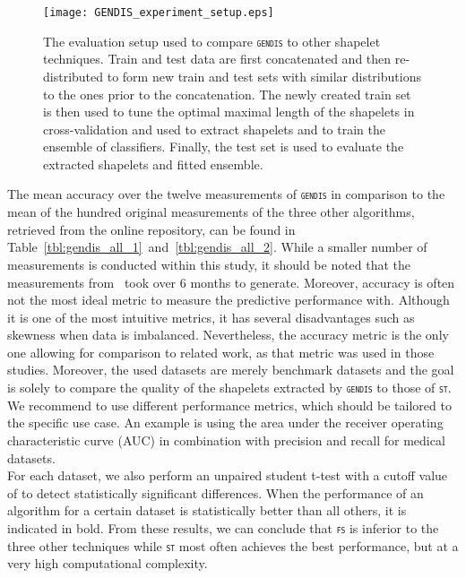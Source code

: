 \documentclass[runningheads]{llncs}
\begin{document}
\begin{figure*}[h!]
	\centering
	\texttt{[image: GENDIS\_experiment\_setup.eps]}
	\caption{The evaluation setup used to compare \textsc{\texttt{gendis}} to other shapelet techniques. Train and test data are first concatenated and then re-distributed to form new train and test sets with similar distributions to the ones prior to the concatenation. The newly created train set is then used to tune the optimal maximal length of the shapelets in cross-validation and used to extract shapelets and to train the ensemble of classifiers. Finally, the test set is used to evaluate the extracted shapelets and fitted ensemble.}
	\label{fig:evaluation_setup}      
\end{figure*}

The mean accuracy over the twelve measurements of \textsc{\texttt{gendis}} in comparison to the mean of the hundred original measurements of the three other algorithms, retrieved from the online repository, can be found in Table~\ref{tbl:gendis_all_1}~and~\ref{tbl:gendis_all_2}. While a smaller number of measurements is conducted within this study, it should be noted that the measurements from~\cite{bagnall2016great} took over 6 months to generate. Moreover, accuracy is often not the most ideal metric to measure the predictive performance with. Although it is one of the most intuitive metrics, it has several disadvantages such as skewness when data is imbalanced. Nevertheless, the accuracy metric is the only one allowing for comparison to related work, as that metric was used in those studies. Moreover, the used datasets are merely benchmark datasets and the goal is solely to compare the quality of the shapelets extracted by \textsc{\texttt{gendis}} to those of \textsc{\texttt{st}}. We recommend to use different performance metrics, which should be tailored to the specific use case. An example is using the area under the receiver operating characteristic curve (AUC) in combination with precision and recall for medical datasets. \\

For each dataset, we also perform an unpaired student t-test with a cutoff value of  to detect statistically significant differences. When the performance of an algorithm for a certain dataset is statistically better than all others, it is indicated in bold. From these results, we can conclude that \textsc{\texttt{fs}} is inferior to the three other techniques while \textsc{\texttt{st}} most often achieves the best performance, but at a very high computational complexity. \\
\end{document}
